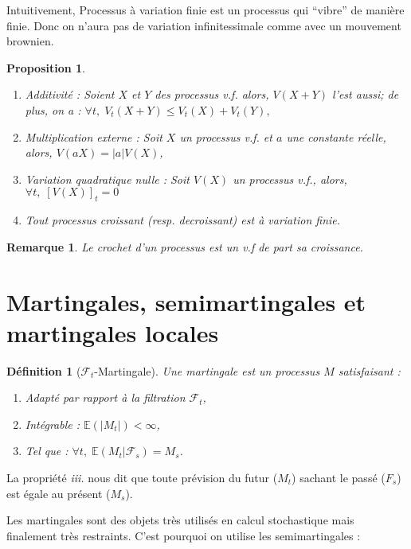 \documentclass[openany]{book}
\newcommand{\F}{\mathscr{F}}
\newcommand{\E}{\mathbb{E}}
\newcommand{\1}{\mathbbm{1}}
\theoremstyle{thmfont}
\theoremstyle{deffont}
\newtheorem{definition}[definition]{Définition}
\theoremstyle{thmfont}
\newtheorem{prop}[prop]{Proposition}
\theoremstyle{deffont}
\newtheorem*{remark}{Remarque}
\begin{document}
Intuitivement, Processus à variation finie est un processus qui ``vibre'' de manière finie. Donc on n'aura pas de variation infinitessimale comme avec un mouvement brownien.

\begin{prop}
  \begin{enumerate}[nosep]
  \item Additivité : Soient $X$ et $Y$ des processus v.f. alors, $V(X+Y)$ l'est aussi; de plus, on a : $\forall t, \; V_t(X+Y) \leq V_t(X)+V_t(Y),$
  \item Multiplication externe : Soit $X$ un processus v.f. et $a$ une constante réelle, alors, $V(aX) = |a| V(X)$,
  \item Variation quadratique nulle : Soit $V(X)$ un processus v.f., alors,\\ $\forall t,\; [V(X)]_t=0$
  \item Tout processus croissant (resp. decroissant) est à variation finie.
  \end{enumerate}
\end{prop}

\begin{remark}
  Le crochet d'un processus est un v.f de part sa croissance.
\end{remark}

\section{Martingales, semimartingales et martingales locales}

\begin{definition}[$\F_t$-Martingale]
  Une \textit{martingale} est un processus $M$ satisfaisant :
  \begin{enumerate}[nosep]
    \item Adapté par rapport à la filtration $\F_t$,
    \item Intégrable : $\E(|M_t|) < \infty$,
    \item Tel que : $\forall t, \; \E(M_t|\F_s) = M_s$.
  \end{enumerate}
\end{definition}

La propriété \textit{iii.} nous dit que toute prévision du futur ($M_t$) sachant le passé ($F_s$) est égale au présent ($M_s$).

Les martingales sont des objets très utilisés en calcul stochastique mais finalement très restraints. C'est pourquoi on utilise les semimartingales :
\end{document}
